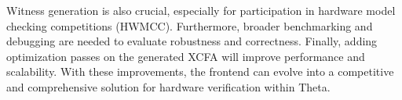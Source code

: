 Witness generation is also crucial, especially for participation in hardware model checking competitions (HWMCC). Furthermore, broader benchmarking and debugging are needed to evaluate robustness and correctness. Finally, adding optimization passes on the generated XCFA will improve performance and scalability. With these improvements, the frontend can evolve into a competitive and comprehensive solution for hardware verification within Theta.
